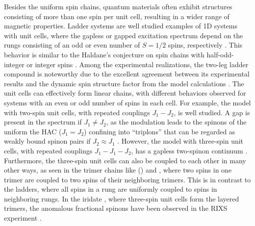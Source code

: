 \documentclass[aps,prx,showpacs,floatfix,twocolumn,superscriptaddress,nofootinbib,longbibliography]{revtex4-2}
\begin{document}
Besides the uniform spin chains, 
quantum materials often exhibit structures consisting of more than one spin per unit cell, resulting in a wider range of magnetic properties.
Ladder systems are well studied examples of 1D systems with unit cells, where the gapless or gapped  excitation spectrum  depend on the  rungs consisting of an odd or even number of $S=1/2$ spins, respectively \cite{dagotto96}. This behavior is  similar
to the Haldane's conjecture on spin chains with half-odd-integer or integer spins \cite{haldane1983}. Among the experimental realizations, the two-leg ladder
compound  is noteworthy due to the excellent agreement between its experimental results and the dynamic spin structure factor from the model calculations \cite{schmidiger13}. 
The  unit cells can  effectively form  linear chains,  with different behaviors observed for systems with an even or odd number of spins in each cell. For example, the model with two-spin unit cells, with repeated couplings $J_1 - J_2$,
is well studied. A gap is present in the spectrum if $J_1 \not= J_2$, as the modulation leads to the spinons of the uniform the HAC ($J_1=J_2$) confining
into ``triplons'' that can be regarded as weakly bound spinon pairs if $J_2 \approx J_1$ \cite{doretto09}. However,
the model with three-spin unit cells, with repeated couplings $J_1 - J_1 - J_2$, has a gapless two-spinon continuum \cite{cheng2022}.  Furthermore,
the three-spin unit cells can also be coupled to each other in many other ways, as seen in the trimer chains like 
() \cite{PhysRevB.71.144411,drillon19931d,belik2005long,PhysRevB.76.014409,PhysRevB.102.035137,PhysRevB.105.134423} and 
\cite{hasegawa2012magnetic}, where two spins in one trimer are coupled to two spins of their neighboring trimers. This is in contrast to the ladders, where all
spins in a rung are  uniformly coupled to spins in neighboring rungs. In the  iridate , where three-spin unit cells form the layered trimers, the anomalous fractional spinons  have been observed in the RIXS experiment \cite{PhysRevLett.129.207201}.
\end{document}
